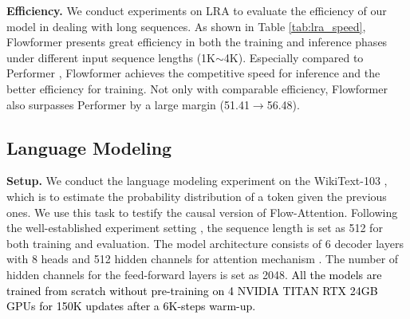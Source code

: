 \documentclass[nohyperref]{article}
\theoremstyle{plain}
\theoremstyle{definition}
\theoremstyle{remark}
\newcommand{\update}[1]{{\textcolor{black}{#1}}}
\begin{document}
\textbf{Efficiency.} We conduct experiments on LRA to evaluate the efficiency of our model in dealing with long sequences. As shown in Table \ref{tab:lra_speed}, Flowformer presents great efficiency in both the training and inference phases under different input sequence lengths (1K$\sim$4K). Especially compared to Performer \cite{performer}, Flowformer achieves the competitive speed for inference and the better efficiency for training. Not only with comparable efficiency, Flowformer also surpasses Performer by a large margin (51.41$\to$56.48).


\subsection{Language Modeling}

\textbf{Setup.} We conduct the language modeling experiment on the WikiText-103 \cite{Merity2017PointerSM}, which is to estimate the probability distribution of a token given the previous ones. We use this task to testify the causal version of Flow-Attention. Following the well-established experiment setting \cite{Peng2021RandomFA}, the sequence length is set as 512 for both training and evaluation. The model architecture consists of 6 decoder layers with 8 heads and 512 hidden channels for attention mechanism \cite{ott2019fairseq}. The number of hidden channels for the feed-forward layers is set as 2048. \update{All the models are trained from scratch without pre-training on 4 NVIDIA TITAN RTX 24GB GPUs for 150K updates after a 6K-steps warm-up.}
\end{document}
